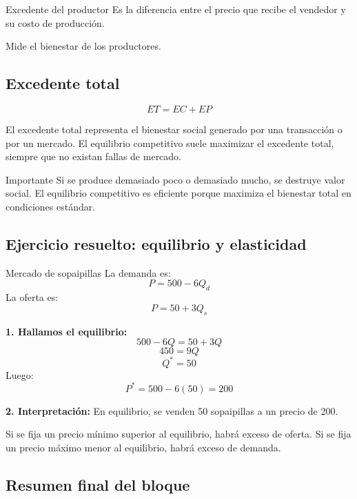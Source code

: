 \begin{concepto}{Excedente del productor}
Es la diferencia entre el precio que recibe el vendedor y su costo de producción.
\end{concepto}

Mide el bienestar de los productores.


\subsection{Excedente total}

\begin{equation}
ET = EC + EP
\end{equation}

El excedente total representa el bienestar social generado por una transacción o por un mercado. El equilibrio competitivo suele maximizar el excedente total, siempre que no existan fallas de mercado.

\begin{advertencia}{Importante}
Si se produce demasiado poco o demasiado mucho, se destruye valor social. El equilibrio competitivo es eficiente porque maximiza el bienestar total en condiciones estándar.
\end{advertencia}

\subsection{Ejercicio resuelto: equilibrio y elasticidad}

\begin{ejercicio}{Mercado de sopaipillas}
La demanda es:
\[P = 500 - 6Q_d\]
La oferta es:
\[P = 50 + 3Q_s\]

\textbf{1. Hallamos el equilibrio:}
\[500 - 6Q = 50 + 3Q\]
\[450 = 9Q\]
\[Q^* = 50\]
Luego:
\[P^* = 500 - 6(50) = 200\]

\textbf{2. Interpretación:}
En equilibrio, se venden 50 sopaipillas a un precio de 200.

Si se fija un precio mínimo superior al equilibrio, habrá exceso de oferta. Si se fija un precio máximo menor al equilibrio, habrá exceso de demanda.
\end{ejercicio}

\subsection{Resumen final del bloque}

